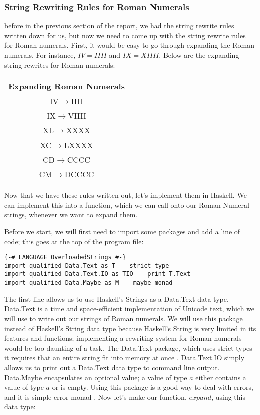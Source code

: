 \documentclass{article}
\begin{document}
\subsubsection{String Rewriting Rules for Roman Numerals}
before in the previous section of the report, we had the string rewrite rules written down for us, but now we need to come up with the string rewrite rules for Roman numerals. First, it would be easy to go through expanding the Roman numerals. For instance, $IV = IIII$ and $IX = XIIII$. Below are the expanding string rewrites for Roman numerals:
\begin{center}
\begin{tabular}{||c||} 
 \hline
 Expanding Roman Numerals \\ [0.5ex] 
 \hline
 IV$\rightarrow$IIII \\
 \hline
 IX$\rightarrow$VIIII \\
 \hline
 XL$\rightarrow$XXXX \\
 \hline
 XC$\rightarrow$LXXXX \\
 \hline
 CD$\rightarrow$CCCC \\
 \hline
 CM$\rightarrow$DCCCC \\
 \hline
\end{tabular}
\end{center}
Now that we have these rules written out, let's implement them in Haskell. We can implement this into a function, which we can call onto our Roman Numeral strings, whenever we want to expand them.

Before we start, we will first need to import some packages and add a line of code; this goes at the top of the program file:
\begin{lstlisting}
{-# LANGUAGE OverloadedStrings #-}
import qualified Data.Text as T -- strict type
import qualified Data.Text.IO as TIO -- print T.Text
import qualified Data.Maybe as M -- maybe monad
\end{lstlisting}
The first line allows us to use Haskell's Strings as a Data.Text data type. Data.Text is a time and space-efficient implementation of Unicode text, which we will use to write out our strings of Roman numerals. We will use this package instead of Haskell's String data type because Haskell's String is very limited in its features and functions; implementing a rewriting system for Roman numerals would be too daunting of a task. The Data.Text package, which uses strict types-it requires that an entire string fit into memory at once \cite{17}. Data.Text.IO simply allows us to print out a Data.Text data type to command line output. Data.Maybe encapsulates an optional value; a value of type $a$ either contains a value of type $a$ or is empty. Using this package is a good way to deal with errors, and it is simple error monad \cite{18}. Now let's make our function, $expand$, using this data type:
\end{document}
